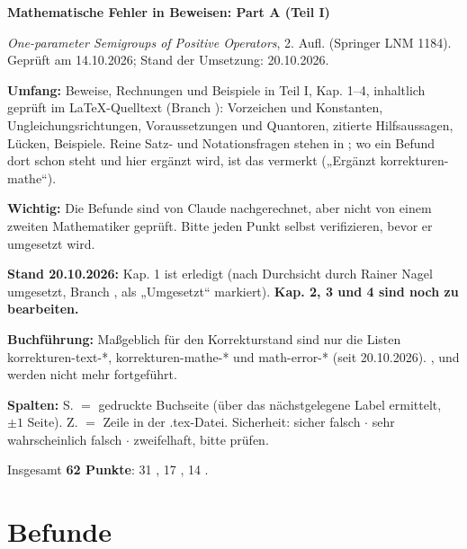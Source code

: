 \documentclass[10pt]{article}
\begin{document}
{\Large\bfseries Mathematische Fehler in Beweisen: Part A (Teil I)\par}
\smallskip
\emph{One-parameter Semigroups of Positive Operators}, 2. Aufl. (Springer LNM 1184). Geprüft am 14.10.2026; Stand der Umsetzung: 20.10.2026.

\textbf{Umfang:} Beweise, Rechnungen und Beispiele in Teil I, Kap. 1–4, inhaltlich geprüft im LaTeX-Quelltext (Branch ): Vorzeichen und Konstanten, Ungleichungsrichtungen, Voraussetzungen und Quantoren, zitierte Hilfsaussagen, Lücken, Beispiele. Reine Satz- und Notationsfragen stehen in ; wo ein Befund dort schon steht und hier ergänzt wird, ist das vermerkt („Ergänzt korrekturen-mathe“).

\textbf{Wichtig:} Die Befunde sind von Claude nachgerechnet, aber nicht von einem zweiten Mathematiker geprüft. Bitte jeden Punkt selbst verifizieren, bevor er umgesetzt wird.

\textbf{Stand 20.10.2026:} Kap. 1 ist erledigt (nach Durchsicht durch Rainer Nagel umgesetzt, Branch , als „Umgesetzt“ markiert). \textbf{Kap. 2, 3 und 4 sind noch zu bearbeiten.}

\textbf{Buchführung:} Maßgeblich für den Korrekturstand sind nur die Listen {korrekturen-text-*}, {korrekturen-mathe-*} und {math-error-*} (seit 20.10.2026). ,  und  werden nicht mehr fortgeführt.

\textbf{Spalten:} S. $=$ gedruckte Buchseite (über das nächstgelegene Label ermittelt, $\ensuremath{\pm}1$ Seite). Z. $=$ Zeile in der .tex-Datei. Sicherheit: \sichA{} sicher falsch $\ensuremath{\cdot}$ \sichB{} sehr wahrscheinlich falsch $\ensuremath{\cdot}$ \sichC{} zweifelhaft, bitte prüfen.

Insgesamt \textbf{62 Punkte}: 31 \sichA{}, 17 \sichB{}, 14 \sichC{}.

\section*{Befunde}
\end{document}
